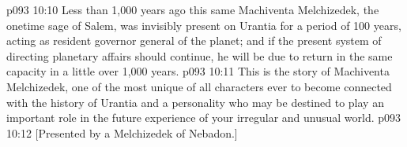 \vs p093 10:10 Less than 1,000 years ago this same Machiventa Melchizedek, the onetime sage of Salem, was invisibly present on Urantia for a period of 100 years, acting as resident governor general of the planet; and if the present system of directing planetary affairs should continue, he will be due to return in the same capacity in a little over 1,000 years.
\vs p093 10:11 \pc This is the story of Machiventa Melchizedek, one of the most unique of all characters ever to become connected with the history of Urantia and a personality who may be destined to play an important role in the future experience of your irregular and unusual world.
\vsetoff
\vs p093 10:12 [Presented by a Melchizedek of Nebadon.]
\quizlink
